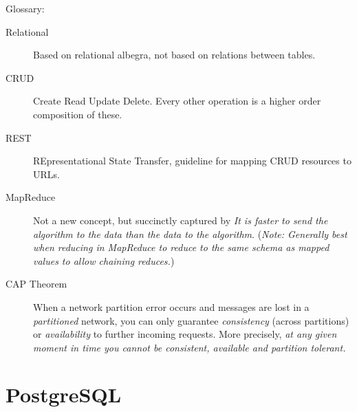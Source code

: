 \documentclass[10pt]{article}
\begin{document}
Glossary:
\begin{description}
    \item[Relational] Based on relational albegra, not based on relations
        between tables.
    \item[CRUD] Create Read Update Delete. Every other operation is a higher
        order composition of these.
    \item[REST] REpresentational State Transfer, guideline for mapping CRUD
        resources to URLs.
    \item[MapReduce] Not a new concept, but succinctly captured by \emph{It is
        faster to send the algorithm to the data than the data to the
        algorithm}. (\emph{Note: Generally best when reducing in MapReduce to
        reduce to the same schema as mapped values to allow chaining reduces.})
    \item[CAP Theorem] When a network partition error occurs and messages are
        lost in a \emph{partitioned} network, you can only guarantee
        \emph{consistency} (across partitions) or \emph{availability} to further
        incoming requests. More precisely, \emph{at any given moment in time you
        cannot be consistent, available and partition tolerant.}
\end{description}

\section{PostgreSQL}
\end{document}
